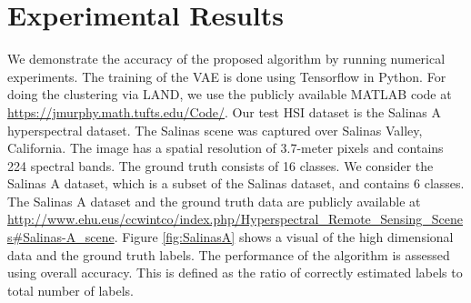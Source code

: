 \documentclass{article}
\begin{document}
\section{Experimental Results}
\label{sec:Experiments}
We demonstrate the accuracy of the proposed algorithm by running numerical experiments. The training of the VAE is done using Tensorflow in Python. For doing the clustering via LAND, we use the publicly available MATLAB code 
at  \url{https://jmurphy.math.tufts.edu/Code/}. Our test HSI dataset is the Salinas A hyperspectral dataset. The Salinas scene was captured over Salinas Valley, California. The image has a spatial resolution of 3.7-meter pixels and contains 224 spectral bands. The ground truth consists of 16 classes. We consider the Salinas A dataset, which is a subset of the Salinas dataset, and contains 6 classes. The Salinas A dataset and the ground truth data are publicly available at \url{http://www.ehu.eus/ccwintco/index.php/Hyperspectral_Remote_Sensing_Scenes#Salinas-A_scene}. Figure \ref{fig:SalinasA} shows a visual of the high dimensional data and the ground truth labels. The performance of the algorithm is assessed using overall accuracy. This is defined as the ratio of correctly estimated labels to total number of labels. 
\end{document}

